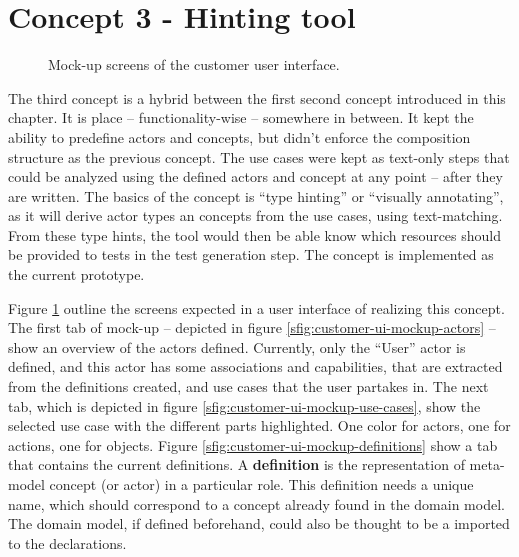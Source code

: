 \section{Concept 3 - Hinting tool}
\label{sec:3rd-iteration}
\begin{figure}[!htbp]
  \centering
    
  \caption{Mock-up screens of the customer user interface.}
  \label{fig:concept3-mockup-screens}
\end{figure}
\noindent The third concept is a hybrid between the first second concept introduced in this chapter. It is place -- functionality-wise -- somewhere in between. It kept the ability to predefine actors and concepts, but didn't enforce the composition structure as the previous concept. The use cases were kept as text-only steps that could be analyzed using the defined actors and concept at any point -- after they are written. The basics of the concept is ``type hinting'' or ``visually annotating'', as it will derive actor types an concepts from the use cases, using text-matching. From these type hints, the tool would then be able know which resources should be provided to tests in the test generation step. The concept is implemented as the current prototype.\medskip

\noindent Figure \ref{fig:concept3-mockup-screens} outline the screens expected in a user interface of realizing this concept. The first tab of mock-up -- depicted in figure \ref{sfig:customer-ui-mockup-actors} -- show an overview of the actors defined. Currently, only the ``User'' actor is defined, and this actor has some associations and capabilities, that are extracted from the definitions created, and use cases that the user partakes in. The next tab, which is depicted in figure \ref{sfig:customer-ui-mockup-use-cases}, show the selected use case with the different parts highlighted. One color for actors, one for actions, one for objects. Figure \ref{sfig:customer-ui-mockup-definitions} show a tab that contains the current definitions. A \textbf{definition} is the representation of meta-model concept (or actor) in a particular role. This definition needs a unique name, which should correspond to a concept already found in the domain model. The domain model, if defined beforehand, could also be thought to be a imported to the declarations.

